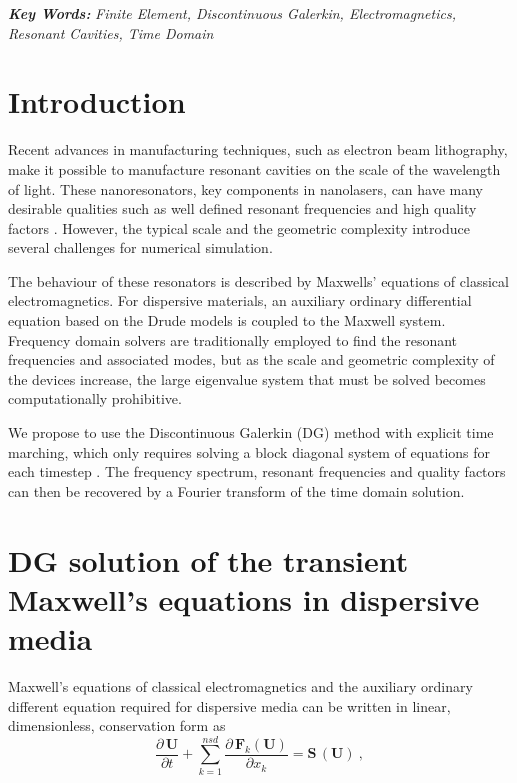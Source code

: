 \documentclass[times,11pt]{ACME2015article}
\newcommand{\mb}{\mathbf}
\begin{document}
\textbf{\textit{Key Words:}} {\it Finite Element, Discontinuous Galerkin, Electromagnetics, Resonant Cavities, Time Domain }
%
\\
\section{Introduction}
Recent advances in manufacturing techniques, such as electron beam lithography, make it possible to manufacture resonant cavities on the scale of the wavelength of light. These nanoresonators, key components in nanolasers, can have many desirable qualities such as well defined resonant frequencies and high quality factors \cite{busch2011discontinuous}. However, the typical scale and the geometric complexity introduce several challenges for numerical simulation.

The behaviour of these resonators is described by Maxwells' equations of classical electromagnetics. For dispersive materials, an auxiliary ordinary differential equation based on the Drude models \cite{taflove1995computational} is coupled to the Maxwell system. Frequency domain solvers are traditionally employed to find the resonant frequencies and associated modes, but as the scale and geometric complexity of the devices increase, the large eigenvalue system that must be solved becomes computationally prohibitive.

We propose to use the Discontinuous Galerkin (DG) method with explicit time marching, which only requires solving a block diagonal system of equations for each timestep \cite{sevilla2014use}. The frequency spectrum, resonant frequencies and quality factors can then be recovered by a Fourier transform of the time domain solution.

\section{DG solution of the transient Maxwell's equations in dispersive media}

Maxwell's equations of classical electromagnetics and the auxiliary ordinary different equation required for dispersive media can be written in linear, dimensionless, conservation form as
\begin{equation}\label{maxwell-eqtns}
\frac{\partial \, \mb{U}}{\partial t} + \sum_{k=1}^{nsd} \frac { \partial \, \mb{F}_k(\mb{U}) }{ \partial x_k } = \mb{S}\,(\mb{U}) \: ,
\end{equation}

\end{document}
